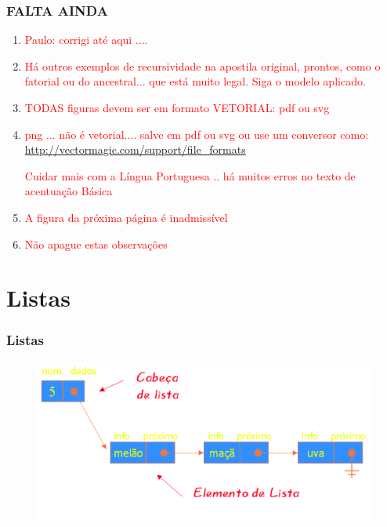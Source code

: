 \documentclass[sans]{beamer}
\begin{document}
\begin{frame}[fragile]   %

\frametitle{FALTA AINDA}

\begin{enumerate}
 \item \textcolor{red}{Paulo: corrigi até aqui .... }

  \item \textcolor{red}{ Há outros exemplos de recursividade na apostila original, prontos, como o fatorial ou do ancestral... que está muito legal. Siga o modelo aplicado.}

  \item \textcolor{red}{TODAS figuras devem ser em formato VETORIAL: pdf ou svg}
  
  \item \textcolor{red}{png ... não é vetorial.... salve em pdf ou svg ou use um conversor como: \url{http://vectormagic.com/support/file_formats}}

 \textcolor{red}{Cuidar mais com a Língua Portuguesa .. há muitos erros no texto de acentuação Básica}

\item \textcolor{red}{A figura da próxima página é inadmissível}


\item \textcolor{red}{Não apague estas observações}

\end{enumerate}
\end{frame}



\section{Listas}

\begin{frame}[fragile]   %
\frametitle{Listas}


\begin{block}
 
\begin{figure}[!htb]
\centering
\includegraphics[scale = 0.6]{figuras/ListaDados.png}
\end{figure}
 
\end{block}   
\end{frame}
\end{document}
